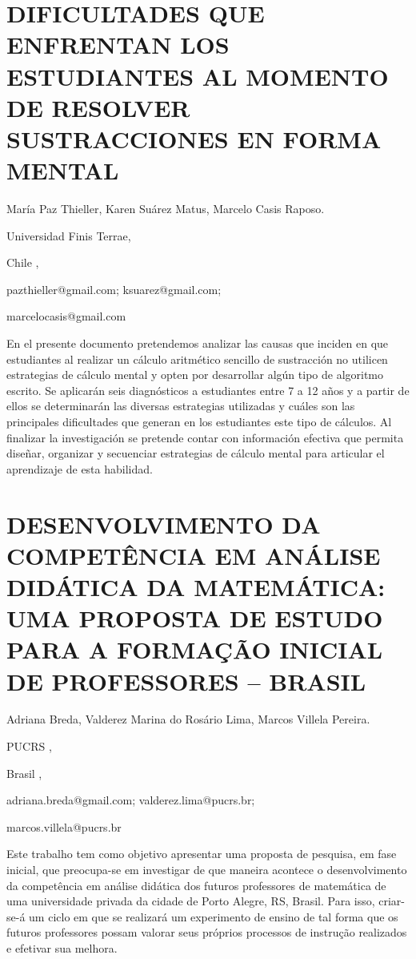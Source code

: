 \section{DIFICULTADES QUE ENFRENTAN LOS ESTUDIANTES AL MOMENTO DE RESOLVER
SUSTRACCIONES EN FORMA MENTAL}

\begin{datos}

María Paz Thieller, Karen Suárez Matus, Marcelo Casis Raposo.

Universidad Finis Terrae, 

Chile ,

pazthieller@gmail.com; ksuarez@gmail.com;

marcelocasis@gmail.com

\end{datos}

En el presente documento pretendemos analizar las causas que inciden
en que estudiantes al realizar un cálculo aritmético sencillo de sustracción
no utilicen estrategias de cálculo mental y opten por desarrollar
algún tipo de algoritmo escrito. Se aplicarán seis diagnósticos a
estudiantes entre 7 a 12 años y a partir de ellos se determinarán
las diversas estrategias utilizadas y cuáles son las principales dificultades
que generan en los estudiantes este tipo de cálculos. Al finalizar
la investigación se pretende contar con información efectiva que permita
diseñar, organizar y secuenciar estrategias de cálculo mental para
articular el aprendizaje de esta habilidad.


\section{DESENVOLVIMENTO DA COMPETÊNCIA EM ANÁLISE DIDÁTICA DA MATEMÁTICA:
UMA PROPOSTA DE ESTUDO PARA A FORMAÇÃO INICIAL DE PROFESSORES – BRASIL}

\begin{datos}

Adriana Breda, Valderez Marina do Rosário Lima, Marcos Villela Pereira.

PUCRS ,

Brasil ,

adriana.breda@gmail.com; valderez.lima@pucrs.br; 

marcos.villela@pucrs.br

\end{datos}

Este trabalho tem como objetivo apresentar uma proposta de pesquisa,
em fase inicial, que preocupa-se em investigar de que maneira acontece
o desenvolvimento da competência em análise didática dos futuros professores
de matemática de uma universidade privada da cidade de Porto Alegre,
RS, Brasil. Para isso, criar-se-á um ciclo em que se realizará um
experimento de ensino de tal forma que os futuros professores possam
valorar seus próprios processos de instrução realizados e efetivar
sua melhora. 


